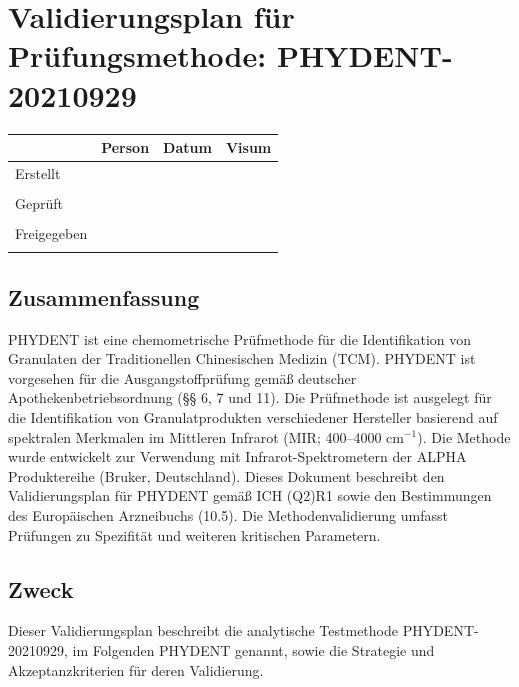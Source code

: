 \documentclass[11pt, a4paper]{article}
\newcommand\VersionPhEur{10.5}
\newcommand\DatumRelease{20210929}
\begin{document}
\section*{Validierungsplan für Prüfungsmethode: PHYDENT-\DatumRelease }

\renewcommand{\arraystretch}{1.2}
\begin{center}
\begin{tabular}{| m{3.5cm} | m{3.5cm}| m{3.5cm} |m{3.5cm}|}
\hline
 & Person & Datum & Visum \\
\hline
Erstellt & & &  \\
& & &\\
\hline
Geprüft & & & \\
& & & \\
\hline
Freigegeben & & & \\
&&&\\
\hline
\end{tabular}
\end{center}









\subsection*{Zusammenfassung}
PHYDENT ist eine chemometrische Prüfmethode für die Identifikation von Granulaten der Traditionellen Chinesischen Medizin (TCM). PHYDENT ist vorgesehen für die Ausgangstoffprüfung gemäß deutscher Apothekenbetriebsordnung (§§ 6, 7 und 11). Die Prüfmethode ist ausgelegt für die Identifikation von Granulatprodukten verschiedener Hersteller basierend auf spektralen Merkmalen im Mittleren Infrarot (MIR; 400–4000 cm$^{-1}$). Die Methode wurde entwickelt zur Verwendung mit Infrarot-Spektrometern der ALPHA Produktereihe (Bruker, Deutschland). Dieses Dokument beschreibt den Validierungsplan für PHYDENT gemäß ICH (Q2)R1 sowie den Bestimmungen des Europäischen Arzneibuchs (\VersionPhEur). Die Methodenvalidierung umfasst Prüfungen zu Spezifität und weiteren kritischen Parametern.


\subsection*{Zweck}
Dieser Validierungsplan beschreibt die analytische Testmethode PHYDENT-20210929, im Folgenden PHYDENT genannt, sowie die Strategie und Akzeptanzkriterien für deren Validierung.
\end{document}
